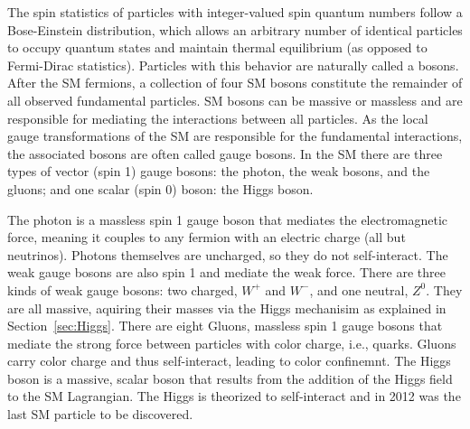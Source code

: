 The spin statistics of particles with integer-valued spin quantum numbers follow a Bose-Einstein distribution, which allows an arbitrary number of identical particles to occupy quantum states and maintain thermal equilibrium (as opposed to Fermi-Dirac statistics). Particles with this behavior are naturally called a bosons. After the SM fermions, a collection of four SM bosons constitute the remainder of all observed fundamental particles. SM bosons can be massive or massless and are responsible for mediating the interactions between all particles. As the local gauge transformations of the SM are responsible for the fundamental interactions, the associated bosons are often called gauge bosons. In the SM there are three types of vector (spin 1) gauge bosons: the photon, the weak bosons, and the gluons; and one scalar (spin 0) boson: the Higgs boson. 

The photon is a massless spin 1 gauge boson that mediates the electromagnetic force, meaning it couples to any fermion with an electric charge (all but neutrinos). Photons themselves are uncharged, so they do not self-interact. The weak gauge bosons are also spin 1 and mediate the weak force. There are three kinds of weak gauge bosons: two charged, $W^+$ and $W^-$, and one neutral, $Z^0$. They are all massive, aquiring their masses via the Higgs mechanisim as explained in Section~\ref{sec:Higgs}. There are eight Gluons, massless spin 1 gauge bosons that mediate the strong force between particles with color charge, i.e., quarks. Gluons carry color charge and thus self-interact, leading to color confinemnt. The Higgs boson is a massive, scalar boson that results from the addition of the Higgs field to the SM Lagrangian. The Higgs is theorized to self-interact and in 2012 was the last SM particle to be discovered. 
